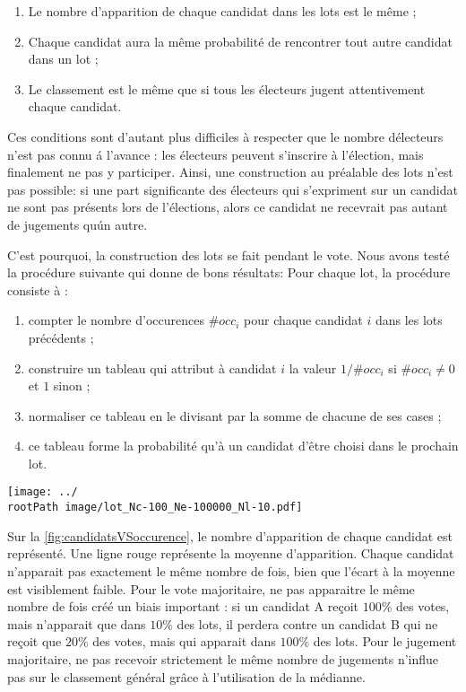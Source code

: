 \documentclass[conference]{IEEEtran}
\newcommand*{\rootPath}{../}
\begin{document}
\begin{enumerate}
  \item Le nombre d'apparition de chaque candidat dans les lots est le m\^eme ;
  \item Chaque candidat aura la m\^eme probabilit\'e de rencontrer tout autre candidat dans un lot ;
  \item Le classement est le m\^eme que si tous les \'electeurs jugent attentivement chaque candidat. 
\end{enumerate}

Ces conditions sont d'autant plus difficiles \`a respecter que le nombre d\'electeurs n'est pas connu \'a l'avance : les \'electeurs peuvent s'inscrire \`a l'\'election, mais finalement ne pas y participer. Ainsi, une construction au pr\'ealable des lots n'est pas possible: si une part significante des \'electeurs qui s'expriment sur un candidat ne sont pas pr\'esents lors de l'\'elections, alors ce candidat ne recevrait pas autant de jugements qu\'un autre.

C'est pourquoi, la construction des lots se fait pendant le vote. Nous avons test\'e la proc\'edure suivante qui donne de bons r\'esultats:
Pour chaque lot, la proc\'edure consiste \`a :
\begin{enumerate}
  \item compter le nombre d'occurences $\#occ_i$ pour chaque candidat $i$ dans les lots pr\'ec\'edents ;
  \item construire un tableau qui attribut \`a candidat $i$ la valeur $1/\#occ_i$ si $\#occ_i \ne 0$ et $1$ sinon ;
  \item normaliser ce tableau en le divisant par la somme de chacune de ses cases ;
  \item ce tableau forme la probabilit\'e qu'\`a un candidat d'\^etre choisi dans le prochain lot.
\end{enumerate}

\begin{figure*}[!ht]
  \centering
  \texttt{[image: ../\\rootPath image/lot\_Nc-100\_Ne-100000\_Nl-10.pdf]}
  \caption{Avec 100000 \'electeurs et 100 candidats, chaque candidat apparait autant de fois que les autres candidats dans les lots}
  \label{fig:candidatsVSoccurence}
\end{figure*}

Sur la \cref{fig:candidatsVSoccurence}, le nombre d'apparition de chaque candidat est repr\'esent\'e. Une ligne rouge repr\'esente la moyenne d'apparition. Chaque candidat n'apparait pas exactement le m\^eme nombre de fois, bien que l'\'ecart \`a la moyenne est visiblement faible. Pour le vote majoritaire, ne pas apparaitre le m\^eme nombre de fois cr\'e\'e un biais important : si un candidat A re\c{c}oit $100\%$ des votes, mais n'apparait que dans $10\%$ des lots, il perdera contre un candidat B qui ne re\c{c}oit que $20\%$ des votes, mais qui apparait dans $100\%$ des lots. Pour le jugement majoritaire, ne pas recevoir strictement le m\^eme nombre de jugements n'influe pas sur le classement g\'en\'eral gr\^ace \`a l'utilisation de la m\'edianne. 
\end{document}
